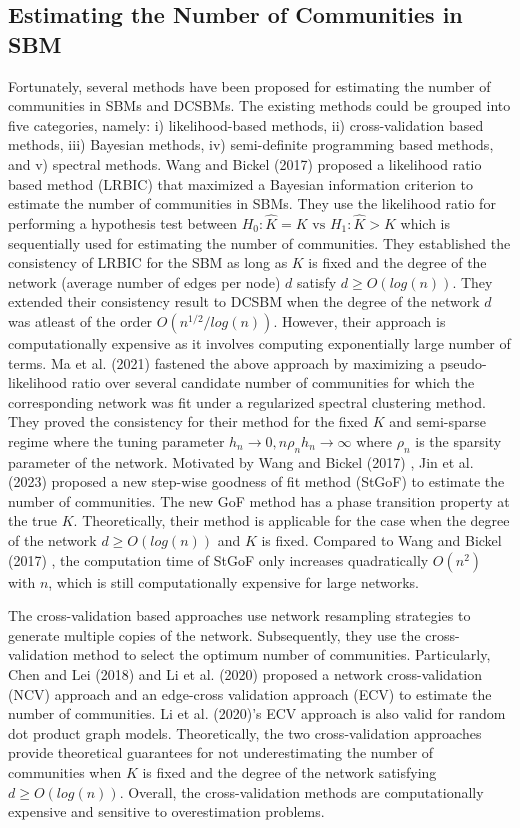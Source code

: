 \documentclass[11pt]{article}
\begin{document}
\subsection{Estimating the Number of Communities in SBM} Fortunately, several methods have been proposed for estimating the number of communities in SBMs and DCSBMs. The existing methods could be grouped into five categories, namely: i) likelihood-based methods, ii) cross-validation based methods, iii) Bayesian methods, iv) semi-definite programming based methods, and v) spectral methods. Wang and Bickel (2017) \cite{wang17} proposed a likelihood ratio based method (LRBIC) that maximized a Bayesian information criterion to estimate the number of communities in SBMs. They use the likelihood ratio for performing a hypothesis test between $H_0: \hat{K}= K \text{ vs } H_1: \hat{K} > K$ which is sequentially used for estimating the number of communities. They established the consistency of LRBIC for the SBM as long as $K$ is fixed and the degree of the network (average number of edges per node) $d$ satisfy  $d \ge O(log(n))$. They extended their consistency result to DCSBM when the degree of the network $d$ was atleast of the order $O(n^{1/2}/ log(n))$. However, their approach is computationally expensive as it involves computing exponentially large number of terms. Ma et al. (2021) \cite{ma2019} fastened the above approach by maximizing a pseudo-likelihood ratio over several candidate number of communities for which the corresponding network was fit under a regularized spectral clustering method. They proved the consistency for their method for the fixed $K$ and semi-sparse regime where the tuning parameter $h_n \to 0, n \rho_n h_n \to \infty$ where $\rho_n$ is the sparsity parameter of the network. Motivated by Wang and Bickel (2017) \cite{wang17}, Jin et al. (2023) \cite{jin2023} proposed a new step-wise goodness of fit method (StGoF) to estimate the number of communities. The new GoF method has a phase transition property at the true $K$. Theoretically, their method is applicable for the case when the degree of the network $d \ge O(log(n))$ and $K$ is fixed. Compared to Wang and Bickel (2017) \cite{wang17}, the computation time of StGoF only increases quadratically $O(n^2)$ with $n$, which is still computationally expensive for large networks.

The cross-validation based approaches use network resampling strategies to generate multiple copies of the network. Subsequently, they use the cross-validation method to select the optimum number of communities. Particularly, Chen and Lei (2018) \cite{chen2018} and Li et al. (2020) \cite{li2020} proposed a network cross-validation (NCV) approach and an edge-cross validation approach (ECV) to estimate the number of communities. Li et  al. (2020)\cite{li2020}'s ECV approach is also valid for random dot product graph models. Theoretically, the two cross-validation approaches provide theoretical guarantees for not underestimating the number of communities when $K$ is fixed and the degree of the network satisfying $d \ge O(log(n))$. Overall, the cross-validation methods are computationally expensive and sensitive to overestimation problems.
\end{document}
